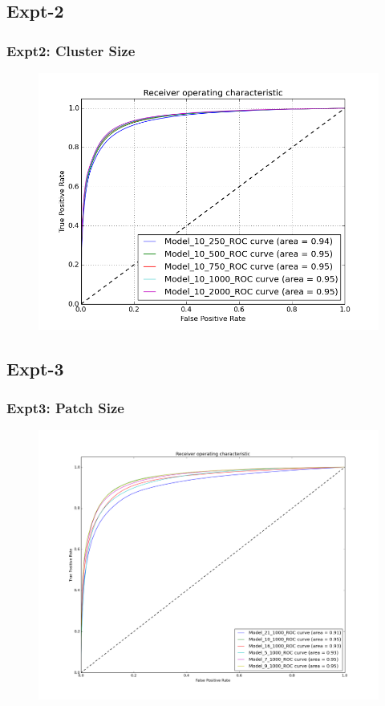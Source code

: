 \documentclass{beamer}
\begin{document}
\subsection{Expt-2}
\begin{frame}
\frametitle{Expt2: Cluster Size}
\begin{figure}
\includegraphics[width=0.8\linewidth]{Images/expt2.png}
\end{figure}
\end{frame}
\subsection{Expt-3}
\begin{frame}
\frametitle{Expt3: Patch Size}
\begin{figure}
\includegraphics[width=0.8\linewidth]{Images/expt3.png}
\end{figure}
\end{frame}
\end{document}
